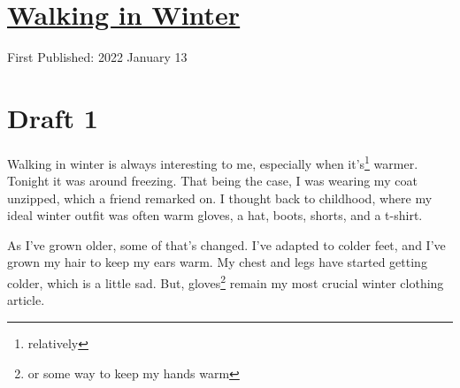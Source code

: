 \documentclass[12pt]{article}[titlepage]
\newcommand{\1}{\={a}}
\newcommand{\2}{\={e}}
\newcommand{\3}{\={\i}}
\newcommand{\4}{\=o}
\newcommand{\5}{\=u}
\newcommand{\6}{\={A}}
\renewcommand{\,}{\textsuperscript{,}}
\begin{document}
\doublespacing
\section{\href{walking-in-winter.html}{Walking in Winter}}
First Published: 2022 January 13

\section{Draft 1}
Walking in winter is always interesting to me, especially when it's\footnote{relatively} warmer.
Tonight it was around freezing.
That being the case, I was wearing my coat unzipped, which a friend remarked on.
I thought back to childhood, where my ideal winter outfit was often warm gloves, a hat, boots, shorts, and a t-shirt.

As I've grown older, some of that's changed.
I've adapted to colder feet, and I've grown my hair to keep my ears warm.
My chest and legs have started getting colder, which is a little sad.
But, gloves\footnote{or some way to keep my hands warm} remain my most crucial winter clothing article.
\end{document}
